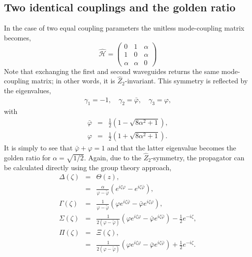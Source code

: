 \documentclass[9pt,twocolumn,twoside]{osajnl}
\begin{document}
\subsection{Two identical couplings and the golden ratio}
In the case of two equal coupling parameters the unitless mode-coupling matrix becomes,
\begin{equation}
\hat{\mathcal{H}}=\left( \begin{array}{ccc}
0 & 1 & \alpha \\
1 & 0 & \alpha \\
\alpha & \alpha & 0 \end{array} \right)	 
\end{equation}
Note that exchanging the first and second waveguides returns the same mode-coupling matrix; in other words, it is $\hat{Z}_2$-invariant. 
This symmetry is reflected by the eigenvalues,
\begin{eqnarray}
\gamma_{1} = -1, \quad \gamma_{2} = \bar{\varphi}, \quad \gamma_{3} = \varphi,
\end{eqnarray}  
with
\begin{eqnarray}
\bar{\varphi} &=& \frac{1}{2} \left(1-\sqrt{8 \alpha ^2+1}\right),\\
\varphi &=& \frac{1}{2} \left( 1 + \sqrt{8 \alpha ^2+1} \right).
\end{eqnarray}
It is simply to see that $\bar{\varphi} + \varphi = 1$ and that the latter eigenvalue 
becomes the golden ratio for $\alpha = \sqrt{1/2}$.
Again, due to the $\hat{Z}_2$-symmetry, the propagator can be calculated directly using the group theory approach,
\begin{eqnarray}
\Delta(\zeta) &=& \Theta(z), \\
&=& \frac{\alpha}{\varphi - \tilde{\varphi}} \left(  e^{i \zeta \varphi }  -  e^{i \zeta \bar{\varphi} } \right), \\
\Gamma(\zeta) &=& \frac{1}{\varphi - \tilde{\varphi}} \left( \varphi e^{i \zeta \bar{\varphi} } - \bar{\varphi}  e^{i \zeta \varphi } \right), \\
\Sigma(\zeta) &=& \frac{1}{2 \left( \varphi - \tilde{\varphi} \right)} \left( \varphi e^{i \zeta \varphi } - \bar{\varphi} e^{i \zeta \bar{\varphi} } \right) - \frac{1}{2} e^{-i \zeta}, \\
\Pi(\zeta) &=& \Xi(\zeta), \\
&=& \frac{1}{2 \left( \varphi - \tilde{\varphi} \right)} \left( \varphi e^{i \zeta \varphi } - \bar{\varphi} e^{i \zeta \bar{\varphi} } \right) + \frac{1}{2} e^{-i \zeta}.
\end{eqnarray}
\end{document}
